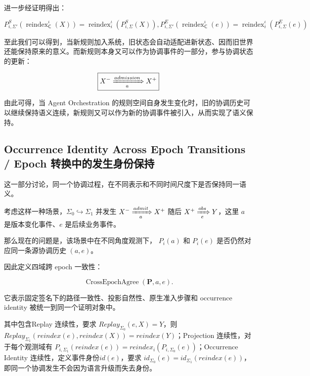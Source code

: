   进一步经证明得出：

  \begin{equation}
    \boxed{
      P_{i,\Sigma'}^S
      (\operatorname{reindex}_{\mathsf C}^{\iota}(X))=\operatorname{reindex}_{i}^{\iota}(P_{i,\Sigma}^S(X)),
      P_{i,\Sigma'}^E(\operatorname{reindex}_{\mathsf C}^{\iota}(e))=
    \operatorname{reindex}_{i}^{\iota}(P_{i,\Sigma}^E(e))}
    \label{eq:projection-reindexing-naturality}
  \end{equation}

  至此我们可以得到，当新规则加入系统，旧状态会自动适配进新状态、因而旧世界还能保持原来的意义。而新规则本身又可以作为协调事件的一部分，参与协调状态的更新：

  \begin{equation}
    \boxed{
      X^-
      \xRightarrow[a]{admission}
      X^+
    }
    \label{eq:native-signature-admission-transition}
  \end{equation}

  由此可得，当 Agent Orchestration 的规则空间自身发生变化时，旧的协调历史可以继续保持语义连续，新规则又可以作为新的协调事件被引入，从而实现了语义保持。

  \subsection{Occurrence Identity Across Epoch Transitions /
  Epoch 转换中的发生身份保持}

  这一部分讨论，同一个协调过程，在不同表示和不同时间尺度下是否保持同一语义。

  考虑这样一种场景，$\Sigma_0 \hookrightarrow \Sigma_1$ 并发生 $X^- \xRightarrow[a]{admit} X^+$ 随后 $X^+ \xRightarrow[e]{obs} Y$，这里 $a$ 是版本变化事件、$e$ 是后续业务事件。

  那么现在的问题是，该场景中在不同角度观测下， $P_{i}(a)$ 和 $P_{i}(e)$ 是否仍然对应同一条源协调历史 $(a,e)$。

  因此定义四域跨 epoch 一致性：

  \begin{equation}
    \boxed{
      \operatorname{CrossEpochAgree}
      \left(
        \mathbf P,
        a,e
      \right).
    }
    \label{eq:cross-epoch-agreement}
  \end{equation}

  它表示固定签名下的路径一致性、投影自然性、原生准入步骤和 occurrence identity 被统一到同一个证明对象中。

  其中包含Replay 连续性，要求 $Replay_{\Sigma_0}(e,X)=Y$，则$Replay_{\Sigma_1}(reindex(e),reindex(X))=reindex(Y)$；Projection 连续性，对于每个观测域有 $P_{i,\Sigma_1}(reindex(e))=reindex_i(P_{i,\Sigma_0}(e))$；Occurrence Identity 连续性，定义事件身份$id(e)$，要求 $id_{\Sigma_0}(e)=id_{\Sigma_1}(reindex(e))$，即同一个协调发生不会因为语言升级而失去身份。

